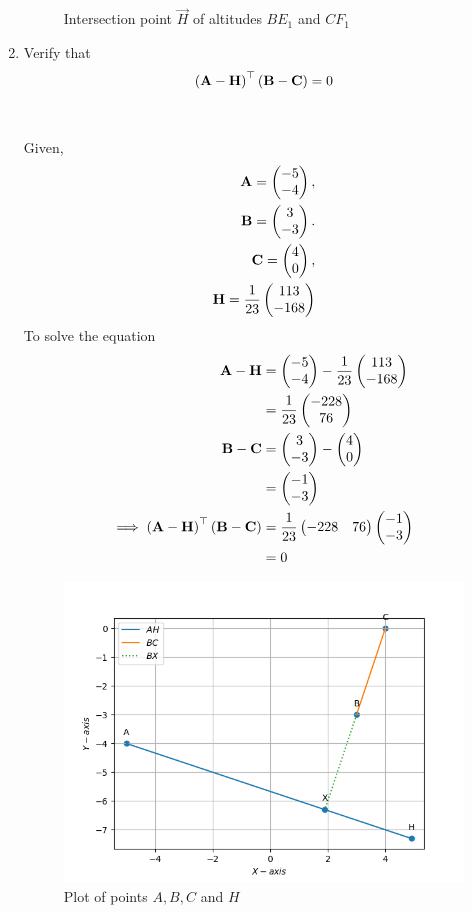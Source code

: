 \documentclass[10pt]{book}
\begin{document}
\begin{enumerate}[label=\thesection.\arabic*.,ref=\thesection.\theenumi]
\begin{figure}[H]
	\caption{Intersection point $\vec{H}$ of altitudes $BE_1$ and $CF_1$}
\label{fig:Interction point}
\end{figure}

\item Verify that 
		\begin{align}
			\left(\mathbf{A}-\mathbf{H}\right)^{\top}\left(\mathbf{B}-\mathbf{C}\right) = 0
		\end{align}\\
  \solution\\
Given,
\begin{align}
            \mathbf{A} = \begin{pmatrix}-5 \\ -4\end{pmatrix},\\ 
            \mathbf{B} = \begin{pmatrix}3 \\ -3\end{pmatrix}.\\
            \mathbf{C} = \begin{pmatrix}4 \\ 0\end{pmatrix},\\
            \mathbf{H} = \frac{1}{23}\begin{pmatrix}113 \\ -168\end{pmatrix}
\end{align}
To solve the equation
\begin{align}
\mathbf{A}-\mathbf{H} &= \begin{pmatrix}-5 \\ -4\end{pmatrix} - \frac{1}{23}\begin{pmatrix}113 \\ -168\end{pmatrix}\\
                &= \frac{1}{23}\begin{pmatrix}-228 \\ 76\end{pmatrix}\\
\mathbf{B}-\mathbf{C} &= \begin{pmatrix}3 \\ -3\end{pmatrix} - \begin{pmatrix}4 \\ 0\end{pmatrix}\\
                &= \begin{pmatrix}-1 \\ -3\end{pmatrix}\\
	\implies \left(\mathbf{A}-\mathbf{H}\right)^{\top}\left(\mathbf{B}-\mathbf{C}\right) &= \frac{1}{23}\begin{pmatrix}-228 & 76\end{pmatrix} \begin{pmatrix}-1 \\ -3\end{pmatrix}\\
                &= 0
\end{align}
\begin{figure}[H]
\includegraphics[width=\columnwidth]{figs/AHBC_verify.png }
\caption{Plot of points $A, B, C$ and $H$}
\label{fig1:Points}
\end{figure}


\end{enumerate}
\end{document}
